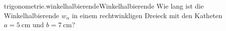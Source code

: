 \begin{exercise}{trigonometrie.winkelhalbierende}{Winkelhalbierende}
  \ifproblem\problem
    Wie lang ist die Winkelhalbierende $w_{\alpha}$ in einem
    rechtwinkligen Dreieck mit den Katheten $a=\SI{5}{\centi\metre}$
    und $b=\SI{7}{\centi\metre}$?
  \fi
\end{exercise}
